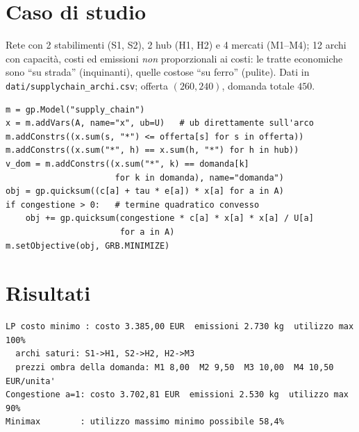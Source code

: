 \section{Caso di studio}

Rete con 2 stabilimenti (S1, S2), 2 hub (H1, H2) e 4 mercati (M1--M4); 12 archi con
capacità, costi ed emissioni \emph{non} proporzionali ai costi: le tratte economiche
sono ``su strada'' (inquinanti), quelle costose ``su ferro'' (pulite). Dati in
\texttt{dati/supplychain\_archi.csv}; offerta $(260, 240)$, domanda totale $450$.

\begin{lstlisting}[style=python]
m = gp.Model("supply_chain")
x = m.addVars(A, name="x", ub=U)   # ub direttamente sull'arco
m.addConstrs((x.sum(s, "*") <= offerta[s] for s in offerta))
m.addConstrs((x.sum("*", h) == x.sum(h, "*") for h in hub))
v_dom = m.addConstrs((x.sum("*", k) == domanda[k]
                      for k in domanda), name="domanda")
obj = gp.quicksum((c[a] + tau * e[a]) * x[a] for a in A)
if congestione > 0:   # termine quadratico convesso
    obj += gp.quicksum(congestione * c[a] * x[a] * x[a] / U[a]
                       for a in A)
m.setObjective(obj, GRB.MINIMIZE)
\end{lstlisting}

\section{Risultati}

\begin{lstlisting}[style=output]
LP costo minimo : costo 3.385,00 EUR  emissioni 2.730 kg  utilizzo max 100%
  archi saturi: S1->H1, S2->H2, H2->M3
  prezzi ombra della domanda: M1 8,00  M2 9,50  M3 10,00  M4 10,50 EUR/unita'
Congestione a=1: costo 3.702,81 EUR  emissioni 2.530 kg  utilizzo max  90%
Minimax        : utilizzo massimo minimo possibile 58,4%
\end{lstlisting}

\begin{center}
\begin{minipage}{\textwidth}
\centering
\\[1.2ex]

\end{minipage}
\end{center}

